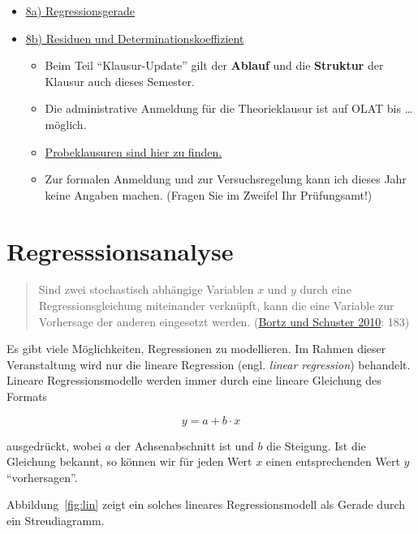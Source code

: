 \documentclass[
  11pt,
  ngerman,
  a4paper,
]{report}
\providecommand{\tightlist}{%
  \setlength{\itemsep}{0pt}\setlength{\parskip}{0pt}}
\begin{document}
\begin{itemize}
\tightlist
\item
  \href{https://video01.uni-frankfurt.de/Mediasite/Play/420909b80f8b467eb43ec85108200d2a1d}{8a) Regressionsgerade}
\item
  \href{https://video01.uni-frankfurt.de/Mediasite/Play/d6a9160c2ba0402fa64395cbdf5d25531d}{8b) Residuen und Determinationskoeffizient}

  \begin{itemize}
  \tightlist
  \item
    Beim Teil \enquote{Klausur-Update} gilt der \textbf{Ablauf} und die \textbf{Struktur} der Klausur auch dieses Semester.
  \item
    Die administrative Anmeldung für die Theorieklausur ist auf OLAT bis \ldots{} möglich.
  \item
    \protect\hyperlink{probeklausuren}{Probeklausuren sind hier zu finden.}
  \item
    Zur formalen Anmeldung und zur Versuchsregelung kann ich dieses Jahr keine Angaben machen. (Fragen Sie im Zweifel Ihr Prüfungsamt!)
  \end{itemize}
\end{itemize}

\hypertarget{regresssionsanalyse}{%
\section{Regresssionsanalyse}\label{regresssionsanalyse}}

\begin{quote}
Sind zwei stochastisch abhängige Variablen \(x\) und \(y\) durch eine Regressionsgleichung miteinander verknüpft, kann die eine Variable zur Vorhersage der anderen eingesetzt werden. (\protect\hyperlink{ref-bortz}{Bortz und Schuster 2010}: 183)
\end{quote}

Es gibt viele Möglichkeiten, Regressionen zu modellieren. Im Rahmen dieser Veranstaltung wird nur die lineare Regression (engl. \emph{linear regression}) behandelt. Lineare Regressionsmodelle werden immer durch eine lineare Gleichung des Formats

\[
y=a+b\cdot x
\label{eq:lin}
\]

ausgedrückt, wobei \(a\) der Achsenabschnitt ist und \(b\) die Steigung. Ist die Gleichung bekannt, so können wir für jeden Wert \(x\) einen entsprechenden Wert \(y\) \enquote{vorhersagen}.

Abbildung~\ref{fig:lin} zeigt ein solches lineares Regressionsmodell als Gerade durch ein Streudiagramm.
\end{document}
